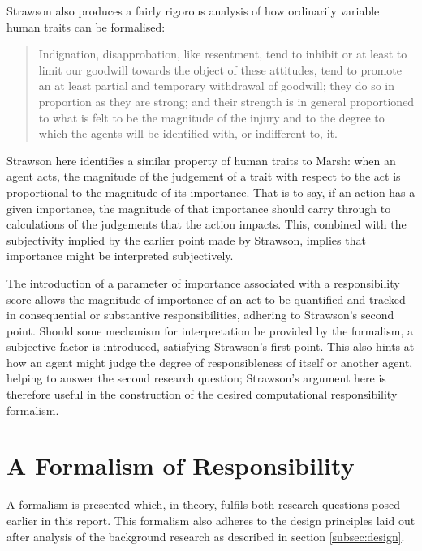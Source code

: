 Strawson also produces a fairly rigorous analysis of how ordinarily variable human traits can be formalised:

\begin{quotation}
    Indignation, disapprobation, like resentment, tend to inhibit or at least to limit our goodwill towards the object of these attitudes, tend to promote an at least partial and temporary withdrawal of goodwill; they do so in proportion as they are strong; and their strength is in general proportioned to what is felt to be the magnitude of the injury and to the degree to which the agents will be identified with, or indifferent to, it.\cite{strawson}
\end{quotation}

Strawson here identifies a similar property of human traits to Marsh: when an agent acts, the magnitude of the judgement of a trait with respect to the act is proportional to the magnitude of its importance. That is to say, if an action has a given importance, the magnitude of that importance should carry through to calculations of the judgements that the action impacts. This, combined with the subjectivity implied by the earlier point made by Strawson, implies that importance might be interpreted subjectively.\par

The introduction of a parameter of importance associated with a responsibility score allows the magnitude of importance of an act to be quantified and tracked in consequential or substantive responsibilities, adhering to Strawson's second point. Should some mechanism for interpretation be provided by the formalism, a subjective factor is introduced, satisfying Strawson's first point. This also hints at how an agent might judge the degree of responsibleness of itself or another agent, helping to answer the second research question; Strawson's argument here is therefore useful in the construction of the desired computational responsibility formalism.\par



\section{A Formalism of Responsibility}\label{sec:formalism_details}
A formalism is presented which, in theory, fulfils both research questions posed earlier in this report. This formalism also adheres to the design principles laid out after analysis of the background research as described in section \ref{subsec:design}.\par

